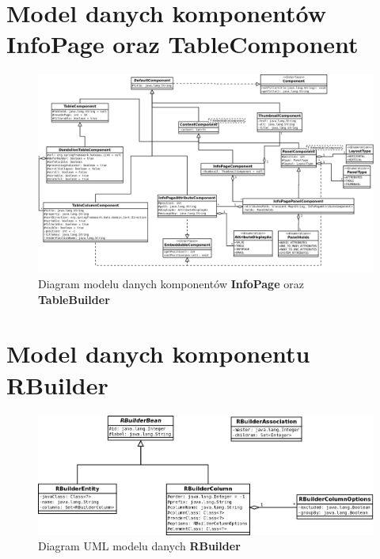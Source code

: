 \section{Model danych komponentów InfoPage oraz TableComponent}
	\begin{figure}[th]
		\centering
		\includegraphics[width=1.0\textwidth]{images/umls/components}
		\caption[Diagram modelu danych komponentów \textbf{InfoPage} oraz \textbf{TableBuilder}]{
			Diagram modelu danych komponentów \textbf{InfoPage} oraz \textbf{TableBuilder}
		}
		\label{app:rbuilder_data_Model}
	\end{figure}

\section{Model danych komponentu \textbf{RBuilder}}
	\begin{figure}[th]
		\centering
		\includegraphics[width=1.0\textwidth]{images/umls/rbuilder}
		\caption[Diagram UML modelu danych \textbf{RBuilder}]{
			Diagram UML modelu danych \textbf{RBuilder}
		}
		\label{app:rbuilder_data_Model}
	\end{figure}
	
